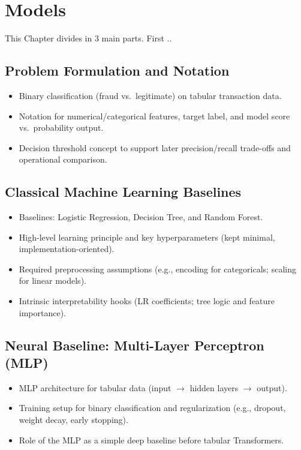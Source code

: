 \chapter{Models}
\label{chap:models}
This Chapter divides in 3 main parts. First .. 

\section{Problem Formulation and Notation}
\label{sec:models_formulation}
\begin{itemize}
  \item Binary classification (fraud vs.\ legitimate) on tabular transaction data.
  \item Notation for numerical/categorical features, target label, and model score vs.\ probability output.
  \item Decision threshold concept to support later precision/recall trade-offs and operational comparison.
\end{itemize}

\section{Classical Machine Learning Baselines}
\label{sec:models_classical_baselines}
\begin{itemize}
  \item Baselines: Logistic Regression, Decision Tree, and Random Forest.
  \item High-level learning principle and key hyperparameters (kept minimal, implementation-oriented).
  \item Required preprocessing assumptions (e.g., encoding for categoricals; scaling for linear models).
  \item Intrinsic interpretability hooks (LR coefficients; tree logic and feature importance).
\end{itemize}

\section{Neural Baseline: Multi-Layer Perceptron (MLP)}
\label{sec:models_mlp}
\begin{itemize}
  \item MLP architecture for tabular data (input $\rightarrow$ hidden layers $\rightarrow$ output).
  \item Training setup for binary classification and regularization (e.g., dropout, weight decay, early stopping).
  \item Role of the MLP as a simple deep baseline before tabular Transformers.
\end{itemize}

